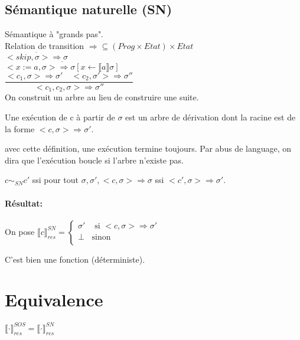 \documentclass[10pt,a4paper]{article}
\newcommand{\semm}[1]{\llbracket #1 \rrbracket }
\begin{document}
\subsection{Sémantique naturelle (SN)}
 
 Sémantique à "grands pas".\\
 Relation de transition $\Rightarrow \subseteq (Prog \times Etat) \times Etat$\\

$\overline{ <skip, \sigma > \Rightarrow \sigma }$\\

$\overline{  <x:=a , \sigma > \Rightarrow \sigma [ x \leftarrow \semm{a } \sigma ] }$\\

$\dfrac{ <c_1, \sigma > \Rightarrow \sigma' \quad <c_2 , \sigma' > \Rightarrow \sigma'' }{<c_1, c_2, \sigma > \Rightarrow \sigma''}$\\


On construit un arbre au lieu de construire une suite.
\begin{definition}[Exécution]
Une exécution de c à partir de $\sigma$ est un arbre de dérivation dont la racine est de la forme $<c, \sigma > \Rightarrow \sigma'$.
\end{definition} 
\begin{rem}
avec cette définition, une exécution termine toujours. Par abus de language, on dira que l'exécution boucle si l'arbre n'existe pas.
\end{rem}
\begin{definition}[Equivalence]
 $c \sim_{SN} c'$ ssi pour tout $\sigma, \sigma', < c, \sigma > \Rightarrow \sigma$ ssi $<c', \sigma > \Rightarrow \sigma'$.
\end{definition} 


\paragraph*{Résultat:}
On pose $\semm{c}_{res}^{SN} = \left\{ \begin{array}{ll}
 \sigma' &\text{ si } <c, \sigma > \Rightarrow \sigma' \\
 \perp & \text{sinon} \\
\end{array} \right.$

\begin{thm} C'est bien une fonction (déterministe).
\end{thm}

\section{Equivalence}
\begin{thm} $ \semm{ \cdot }_{res}^{SOS} = \semm{ \cdot }_{res}^{SN}$
\end{thm}
\end{document}
